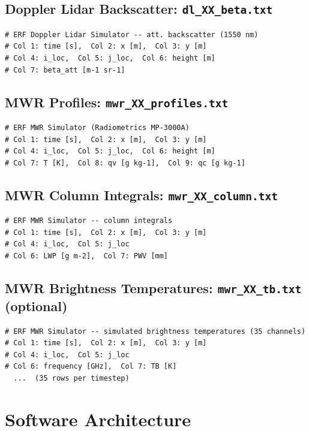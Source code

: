 \documentclass[11pt,letterpaper]{article}
\begin{document}
\subsection{Doppler Lidar Backscatter: \texttt{dl\_XX\_beta.txt}}
\begin{lstlisting}
# ERF Doppler Lidar Simulator -- att. backscatter (1550 nm)
# Col 1: time [s],  Col 2: x [m],  Col 3: y [m]
# Col 4: i_loc,  Col 5: j_loc,  Col 6: height [m]
# Col 7: beta_att [m-1 sr-1]
\end{lstlisting}

\subsection{MWR Profiles: \texttt{mwr\_XX\_profiles.txt}}
\begin{lstlisting}
# ERF MWR Simulator (Radiometrics MP-3000A)
# Col 1: time [s],  Col 2: x [m],  Col 3: y [m]
# Col 4: i_loc,  Col 5: j_loc,  Col 6: height [m]
# Col 7: T [K],  Col 8: qv [g kg-1],  Col 9: qc [g kg-1]
\end{lstlisting}

\subsection{MWR Column Integrals: \texttt{mwr\_XX\_column.txt}}
\begin{lstlisting}
# ERF MWR Simulator -- column integrals
# Col 1: time [s],  Col 2: x [m],  Col 3: y [m]
# Col 4: i_loc,  Col 5: j_loc
# Col 6: LWP [g m-2],  Col 7: PWV [mm]
\end{lstlisting}

\subsection{MWR Brightness Temperatures: \texttt{mwr\_XX\_tb.txt} (optional)}
\begin{lstlisting}
# ERF MWR Simulator -- simulated brightness temperatures (35 channels)
# Col 1: time [s],  Col 2: x [m],  Col 3: y [m]
# Col 4: i_loc,  Col 5: j_loc
# Col 6: frequency [GHz],  Col 7: TB [K]
  ...  (35 rows per timestep)
\end{lstlisting}

\section{Software Architecture}
\end{document}
